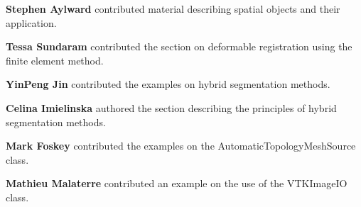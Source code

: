 {\bf Stephen Aylward} contributed material describing spatial objects and
their application.

{\bf Tessa Sundaram} contributed the section on deformable registration using
the finite element method.

{\bf YinPeng Jin} contributed the examples on  hybrid segmentation methods. 

{\bf Celina Imielinska} authored the section describing the principles of
hybrid segmentation methods.

{\bf Mark Foskey} contributed the examples on the
AutomaticTopologyMeshSource class.

{\bf Mathieu Malaterre} contributed an example on the use of the VTKImageIO
class.



